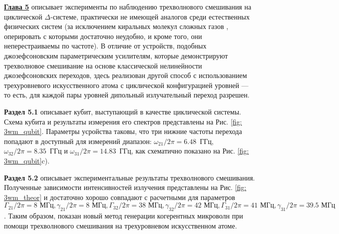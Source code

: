 \textbf{\underline{Глава 5}} описывает эксперименты по наблюдению трехволнового смешивания на циклической $\Delta$-системе, практически не имеющей аналогов среди естественных физических систем (за исключением киральных молекул сложных газов \cite{Chiral}, оперировать с которыми достаточно неудобно, и кроме того, они неперестраиваемы по частоте). В отличие от устройств, подобных джозефсоновским параметрическим усилителям, которые демонстрируют трехволновое смешивание на основе классической нелинейности джозефсоновских переходов, здесь реализован другой способ с использованием трехуровневого искусственного атома с циклической конфигурацией уровней --- то есть, для каждой пары уровней дипольный излучательный переход разрешен. 

\textbf{Раздел 5.1} описывает кубит, выступающий в качестве циклической системы. Схема кубита и результаты измерения его спектров представлены на Рис. \ref{fig: 3wm_qubit}. Параметры усройства таковы, что три нижние частоты перехода попадают в доступный для измерений диапазон: $\omega_{21}/2\pi = 6.48$~ГГц, $\omega_{32}/2\pi = 8.35$~ГГц и $\omega_{31}/2\pi = 14.83$~ГГц, как схематично показано на Рис. \ref{fig: 3wm_qubit}c). 

\textbf{Раздел 5.2} описывает экспериментальные результаты трехволнового смешивания. Полученные зависимости интенсивностей излучения представлены на Рис. \ref{fig: 3wm_theor} и достаточно хорошо совпадают с расчетными для параметров $\Gamma_{21}/2\pi = 8 \text{ МГц}, \gamma_{21}/2\pi = 8 \text{ МГц}, \Gamma_{32}/2\pi = 38 \text{ МГц}, \gamma_{32}/2\pi = 42 \text{ МГц}, \Gamma_{31}/2\pi = 41 \text{ МГц}, \gamma_{31}/2\pi = 39.5 \text{ МГц} $. Таким образом, показан новый метод генерации когерентных микроволн при помощи трехволнового смешивания на трехуровневом искусственном атоме.

